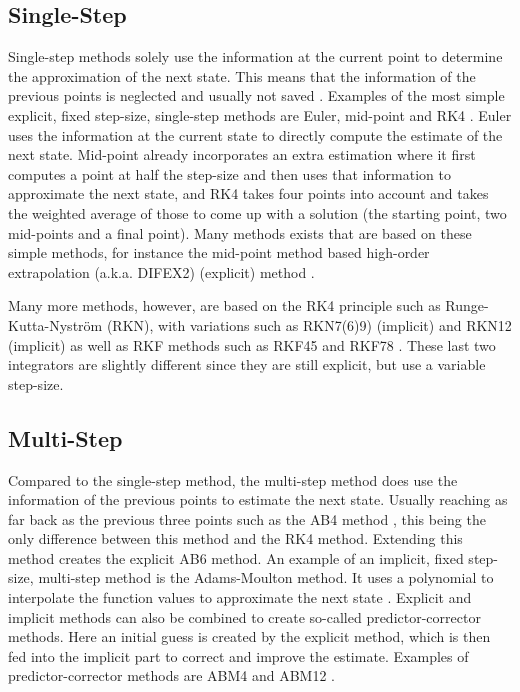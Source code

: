 


\subsection{Single-Step}
\label{subsec:singleStep}
Single-step methods solely use the information at the current point to determine the approximation of the next state. This means that the information of the previous points is neglected and usually not saved \citep{noomen2013int}. Examples of the most simple explicit, fixed step-size, single-step methods are Euler, mid-point and \ac{RK4} \citep{hofsteenge2013}. Euler uses the information at the current state to directly compute the estimate of the next state. Mid-point already incorporates an extra estimation where it first computes a point at half the step-size and then uses that information to approximate the next state, and \ac{RK4} takes four points into account and takes the weighted average of those to come up with a solution (the starting point, two mid-points and a final point). Many methods exists that are based on these simple methods, for instance the mid-point method based high-order extrapolation (a.k.a. DIFEX2) (explicit) method \citep{deuflhard1994}.

Many more methods, however, are based on the \ac{RK4} principle such as Runge-Kutta-Nystr\"{o}m (RKN), with variations such as RKN7(6)9) (implicit) \citep{montenbruck1992,dormand1987} and \ac{RKN12} (implicit) \citep{montenbruck1992}  as well as \ac{RKF} methods such as \acf{RKF45} and \acf{RKF78} \citep{fehlberg1969,fehlberg1968}. These last two integrators are slightly different since they are still explicit, but use a variable step-size.


\subsection{Multi-Step}
\label{subsec:multiStep}
Compared to the single-step method, the multi-step method does use the information of the previous points to estimate the next state. Usually reaching as far back as the previous three points such as the \ac{AB4} method \citep{noomen2013int}, this being the only difference between this method and the \ac{RK4} method. Extending this method creates the explicit \ac{AB6} method. An example of an implicit, fixed step-size, multi-step method is the Adams-Moulton method. It uses a polynomial to interpolate the function values to approximate the next state \citep{noomen2013int}. Explicit and implicit methods can also be combined to create so-called predictor-corrector methods. Here an initial guess is created by the explicit method, which is then fed into the implicit part to correct and improve the estimate. Examples of predictor-corrector methods are \ac{ABM4} and \ac{ABM12} \citep{montenbruck1992,noomen2013int}. 


